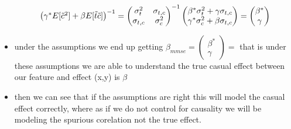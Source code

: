 \documentclass{article}
\begin{document}
\begin{itemize}
$$\begin{pmatrix}
\gamma^{*}E[\tilde{c}^2]+\beta E[\tilde{t}\Tilde{c}]\end{pmatrix}^{-1}=\begin{pmatrix}
    \sigma^2_{t} & \sigma_{t,c}\\ \sigma_{t,c} & \sigma^2_{c}
\end{pmatrix}^{-1}\begin{pmatrix}
    \beta^{*}\sigma_{t}^2+\gamma \sigma_{t,c}\\ 
\gamma^{*}\sigma_{c}^2+\beta \sigma_{t,c}\end{pmatrix}=\begin{pmatrix}
    \beta^{*}\\ \gamma
\end{pmatrix}$$
\item under the assumptions we end up getting $\beta_{mmse}=\begin{pmatrix}
    \beta^{*}\\ \gamma
\end{pmatrix}=$ that is under these assumptions we are able to understand the true casual effect between our feature and effect (x,y) is $\beta$
\item then we can see that if the assumptions are right this will model the casual effect correctly, where as 
if we do not control for causality we will be modeling the spurious corelation not the true effect. 


\end{itemize}
\end{document}
